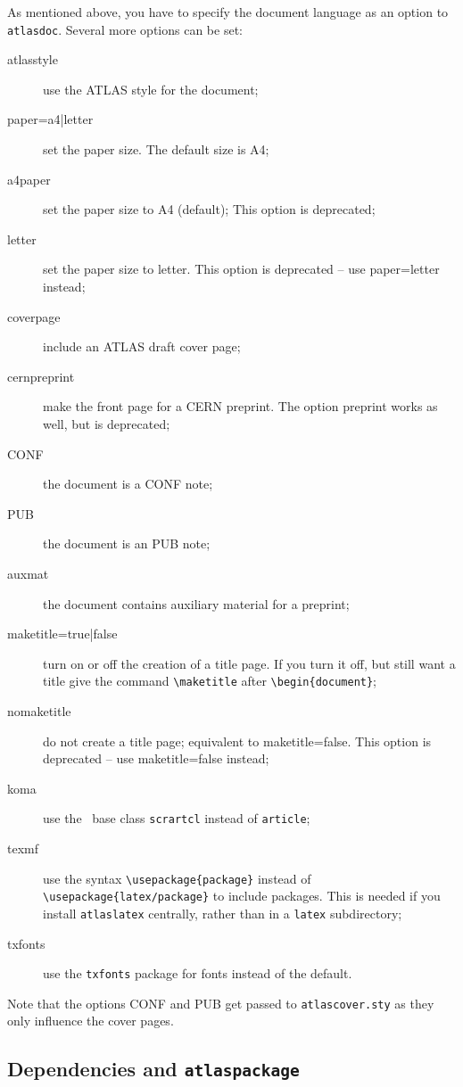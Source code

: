 \documentclass[atlasstyle,UKenglish]{latex/atlasdoc}
\newcommand{\File}[1]{\texttt{#1}\xspace}
\newcommand{\Macro}[1]{\texttt{\textbackslash #1}\xspace}
\newcommand{\Option}[1]{\textsf{#1}\xspace}
\newcommand{\Package}[1]{\texttt{#1}\xspace}
\begin{document}
As mentioned above, you have to specify the document language as an option to \Package{atlasdoc}.
Several more options can be set:
\begin{description}
\item[atlasstyle] use the ATLAS style for the document;
\item[paper=a4|letter] set the paper size. The default size is A4;
\item[a4paper] set the paper size to A4 (default);
  This option is deprecated;
\item[letter] set the paper size to letter.
  This option is deprecated -- use \Option{paper=letter} instead;
\item[coverpage] include an ATLAS draft cover page;
\item[cernpreprint] make the front page for a CERN preprint.
  The option \Option{preprint} works as well, but is deprecated;
\item[CONF] the document is a CONF note;
\item[PUB] the document is an PUB note;
\item[auxmat] the document contains auxiliary material for a preprint;
\item[maketitle=true|false] turn on or off the creation of a title page. If you turn it off,
  but still want a title give the command \Macro{maketitle} after
  \verb|\begin{document}|;
\item[nomaketitle] do not create a title page; equivalent to \Option{maketitle=false}.
  This option is deprecated -- use \Option{maketitle=false} instead;
\item[koma] use the \KOMAScript\ base class \Package{scrartcl} instead of \Package{article};
\item[texmf] use the syntax \Macro{usepackage\{package\}}
  instead of \Macro{usepackage\{latex/package\}} to include packages.
  This is needed if you install \Package{atlaslatex} centrally,
  rather than in a \File{latex} subdirectory;
\item[txfonts] use the \Package{txfonts} package for fonts instead of the default.
\end{description}
Note that the options \Option{CONF} and \Option{PUB} get passed to \Package{atlascover.sty}
as they only influence the cover pages.


\subsection{Dependencies and \Package{atlaspackage}}
\label{sec:atlaspackage}
\end{document}
